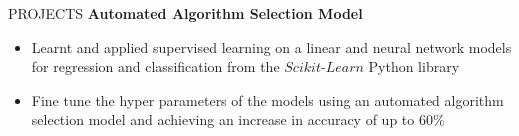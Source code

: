 \documentclass{resume} %
\begin{document}
\begin{rSection}{PROJECTS}
\textbf{Automated Algorithm Selection Model}
\vspace*{-5pt}
\begin{itemize}
    \itemsep -5pt {} 
    \item Learnt and applied supervised learning on a linear and neural network models for regression and classification from the $Scikit\text{-}Learn$ Python library 
    \item Fine tune the hyper parameters of the models using an automated algorithm selection model and achieving an increase in accuracy of up to 60\%
\end{itemize}

\end{rSection} 


\end{document}

